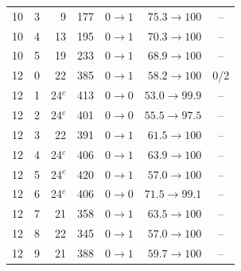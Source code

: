 \documentclass[conference]{IEEEtran}
\begin{document}
\begin{table}[t]
\begin{tabular}{@{}llrrrrc@{}}
10 & 3 & 9  & 177 & $0\to1$ & $75.3\to100$ & -- \\
10 & 4 & 13 & 195 & $0\to1$ & $70.3\to100$ & -- \\
10 & 5 & 19 & 233 & $0\to1$ & $68.9\to100$ & -- \\
\midrule
12 & 0 & 22 & 385 & $0\to1$ & $58.2\to100$ & 0/2 \\
12 & 1 & 24$^{c}$ & 413 & $0\to0$ & $53.0\to99.9$ & -- \\
12 & 2 & 24$^{c}$ & 401 & $0\to0$ & $55.5\to97.5$ & -- \\
12 & 3 & 22 & 391 & $0\to1$ & $61.5\to100$ & -- \\
12 & 4 & 24$^{c}$ & 406 & $0\to1$ & $63.9\to100$ & -- \\
12 & 5 & 24$^{c}$ & 420 & $0\to1$ & $57.0\to100$ & -- \\
12 & 6 & 24$^{c}$ & 406 & $0\to0$ & $71.5\to99.1$ & -- \\
12 & 7 & 21 & 358 & $0\to1$ & $63.5\to100$ & -- \\
12 & 8 & 22 & 345 & $0\to1$ & $57.0\to100$ & -- \\
12 & 9 & 21 & 388 & $0\to1$ & $59.7\to100$ & -- \\
\bottomrule
\end{tabular}
\end{table}
\end{document}
